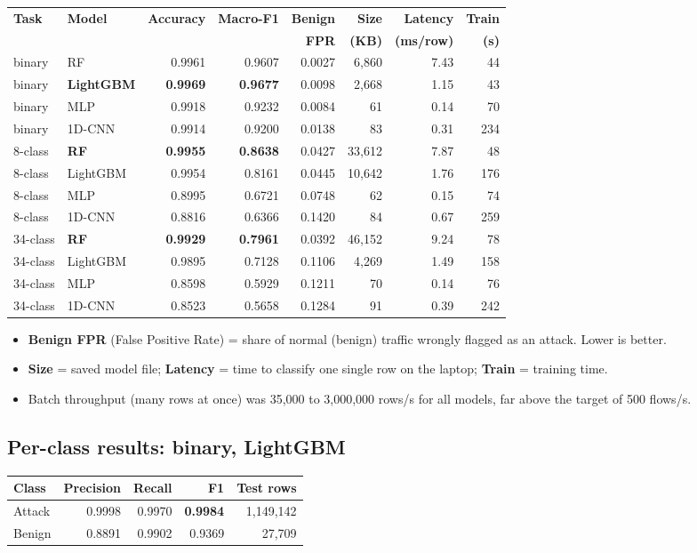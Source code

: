 \documentclass[11pt]{article}
\begin{document}
\begin{longtable}{@{}l l r r r r r r@{}}
\toprule
\textbf{Task} & \textbf{Model} & \textbf{Accuracy} & \textbf{Macro-F1} & \textbf{Benign} & \textbf{Size} & \textbf{Latency} & \textbf{Train} \\
 & & & & \textbf{FPR} & \textbf{(KB)} & \textbf{(ms/row)} & \textbf{(s)} \\
\midrule
\endhead
binary  & RF     & 0.9961 & 0.9607 & 0.0027 & 6,860  & 7.43 & 44 \\
binary  & \textbf{LightGBM} & \textbf{0.9969} & \textbf{0.9677} & 0.0098 & 2,668  & 1.15 & 43 \\
binary  & MLP    & 0.9918 & 0.9232 & 0.0084 & 61     & 0.14 & 70 \\
binary  & 1D-CNN & 0.9914 & 0.9200 & 0.0138 & 83     & 0.31 & 234 \\
\midrule
8-class & \textbf{RF} & \textbf{0.9955} & \textbf{0.8638} & 0.0427 & 33,612 & 7.87 & 48 \\
8-class & LightGBM & 0.9954 & 0.8161 & 0.0445 & 10,642 & 1.76 & 176 \\
8-class & MLP    & 0.8995 & 0.6721 & 0.0748 & 62     & 0.15 & 74 \\
8-class & 1D-CNN & 0.8816 & 0.6366 & 0.1420 & 84     & 0.67 & 259 \\
\midrule
34-class & \textbf{RF} & \textbf{0.9929} & \textbf{0.7961} & 0.0392 & 46,152 & 9.24 & 78 \\
34-class & LightGBM & 0.9895 & 0.7128 & 0.1106 & 4,269 & 1.49 & 158 \\
34-class & MLP    & 0.8598 & 0.5929 & 0.1211 & 70     & 0.14 & 76 \\
34-class & 1D-CNN & 0.8523 & 0.5658 & 0.1284 & 91 & 0.39 & 242 \\
\bottomrule
\end{longtable}

\begin{itemize}
\item \textbf{Benign FPR} (False Positive Rate) = share of normal (benign) traffic wrongly flagged as an attack. Lower is better.
\item \textbf{Size} = saved model file; \textbf{Latency} = time to classify one single row on the laptop; \textbf{Train} = training time.
\item Batch throughput (many rows at once) was 35,000 to 3,000,000 rows/s for all models, far above the target of 500 flows/s.
\end{itemize}

\subsection*{Per-class results: binary, LightGBM}
\begin{tabular}{@{}l r r r r@{}}
\toprule
\textbf{Class} & \textbf{Precision} & \textbf{Recall} & \textbf{F1} & \textbf{Test rows} \\
\midrule
Attack & 0.9998 & 0.9970 & \textbf{0.9984} & 1,149,142 \\
Benign & 0.8891 & 0.9902 & 0.9369 & 27,709 \\
\bottomrule
\end{tabular}
\end{document}
